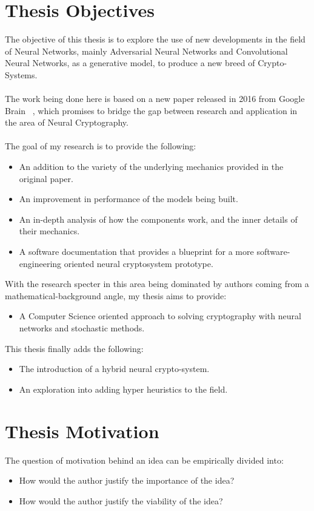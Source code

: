 \documentclass[a4paper, 12pt]{report}
\begin{document}
\section{\textbf{Thesis Objectives}}
The objective of this thesis is to explore the use of new developments in the field of Neural Networks, mainly Adversarial Neural Networks and Convolutional Neural Networks, as a generative model, to produce a new breed of Crypto-Systems.\\\\
The work being done here is based on a new paper released in 2016 from Google Brain ~\citep{DBLP:journals/corr/AbadiA16}, which promises to bridge the gap between research and application in the area of Neural Cryptography.\\\\
The goal of my research is to provide the following:
\begin{itemize}
	\item An addition to the variety of the underlying mechanics provided in the original paper.
	\item An improvement in performance of the models being built.
	\item An in-depth analysis of how the components work, and the inner details of their mechanics.
	\item A software documentation that provides a blueprint for a more software-engineering oriented neural cryptosystem prototype.
\end{itemize}
With the research specter in this area being dominated by authors coming from a mathematical-background angle, my thesis aims to provide:
\begin{itemize}
	\item A Computer Science oriented approach to solving cryptography with neural networks and stochastic methods.
\end{itemize}
This thesis finally adds the following:
\begin{itemize}
	\item The introduction of a hybrid neural crypto-system.
	\item An exploration into adding hyper heuristics to the field.
\end{itemize}
\newpage
\section{\textbf{Thesis Motivation}}
The question of motivation behind an idea can be empirically divided into:
\begin{itemize}[nosep]
	\item How would the author justify the importance of the idea?
	\item How would the author justify the viability of the idea?
\end{itemize}
\end{document}
